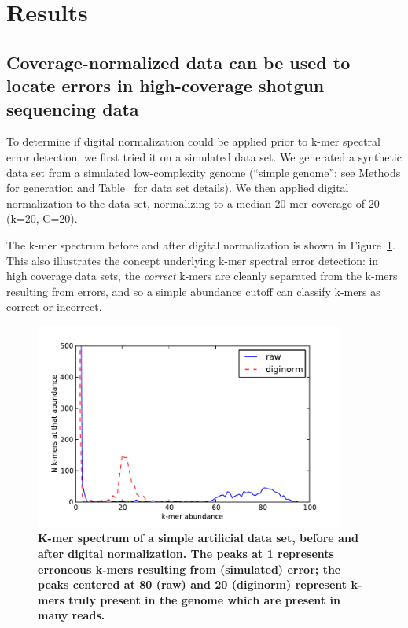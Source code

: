 \documentclass{article}
\begin{document}
\section{Results}

\subsection{Coverage-normalized data can be used to locate
errors in high-coverage shotgun sequencing data}

To determine if digital normalization could be applied prior to k-mer
spectral error detection, we first tried it on a simulated data set.
We generated a synthetic data set from a simulated low-complexity
genome (``simple genome''; see Methods for generation and
Table~\label{tab:data} for data set details). We then applied digital
normalization to the data set, normalizing to a median 20-mer coverage
of 20 (k=20, C=20).

The k-mer spectrum before and after digital normalization is shown in
Figure~\ref{fig:spectrum}.  This also illustrates the concept
underlying k-mer spectral error detection: in high coverage data sets,
the {\em correct} k-mers are cleanly separated from the k-mers resulting
from errors, and so a simple abundance cutoff can classify k-mers as
correct or incorrect.

\begin{figure}[!ht]
 \centerline{\includegraphics[width=4in]{./figures/kmer-spectrum}}
\caption{\bf K-mer spectrum of a simple artificial data set, before and after digital normalization.  The peaks at 1 represents erroneous k-mers resulting
from (simulated) error; the peaks centered at 80 (raw) and 20 (diginorm)
represent k-mers truly present in the genome which are present in many reads.}
\label{fig:spectrum}
\end{figure}
\end{document}
